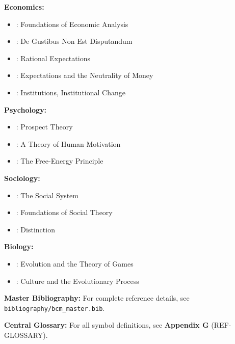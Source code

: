 \textbf{Economics:}
\begin{itemize}[nosep]
    \item \citet{samuelson1947}: Foundations of Economic Analysis
    \item \citet{stiglerbecker1977}: De Gustibus Non Est Disputandum
    \item \citet{muth1961}: Rational Expectations
    \item \citet{lucas1972}: Expectations and the Neutrality of Money
    \item \citet{PAP-north1990institutions}: Institutions, Institutional Change
\end{itemize}

\textbf{Psychology:}
\begin{itemize}[nosep]
    \item \citet{kahnemantversky1979}: Prospect Theory
    \item \citet{maslow1943}: A Theory of Human Motivation
    \item \citet{friston2010}: The Free-Energy Principle
\end{itemize}

\textbf{Sociology:}
\begin{itemize}[nosep]
    \item \citet{parsons1951}: The Social System
    \item \citet{coleman1990}: Foundations of Social Theory
    \item \citet{bourdieu1984}: Distinction
\end{itemize}

\textbf{Biology:}
\begin{itemize}[nosep]
    \item \citet{maynardsmith1982}: Evolution and the Theory of Games
    \item \citet{boydricherson}: Culture and the Evolutionary Process
\end{itemize}

\begin{tcolorbox}[colback=blue!5!white, colframe=blue!75!black]
\textbf{Master Bibliography:} For complete reference details, see
\texttt{bibliography/bcm\_master.bib}.

\textbf{Central Glossary:} For all symbol definitions, see
\textbf{Appendix G} (REF-GLOSSARY).
\end{tcolorbox}


